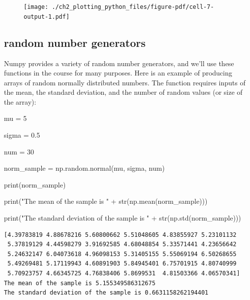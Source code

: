 \documentclass[
  letterpaper,
  DIV=11,
  numbers=noendperiod]{scrreprt}
\newenvironment{Shaded}{\begin{snugshade}}{\end{snugshade}}
\newcommand{\BuiltInTok}[1]{\textcolor[rgb]{0.00,0.23,0.31}{#1}}
\newcommand{\DecValTok}[1]{\textcolor[rgb]{0.68,0.00,0.00}{#1}}
\newcommand{\FloatTok}[1]{\textcolor[rgb]{0.68,0.00,0.00}{#1}}
\newcommand{\NormalTok}[1]{\textcolor[rgb]{0.00,0.23,0.31}{#1}}
\newcommand{\OperatorTok}[1]{\textcolor[rgb]{0.37,0.37,0.37}{#1}}
\newcommand{\StringTok}[1]{\textcolor[rgb]{0.13,0.47,0.30}{#1}}
\begin{document}
\begin{figure}[H]

{\centering \texttt{[image: ./ch2\_plotting\_python\_files/figure-pdf/cell-7-output-1.pdf]}

}

\end{figure}

\hypertarget{random-number-generators}{%
\subsection{random number generators}\label{random-number-generators}}

Numpy provides a variety of random number generators, and we'll use
these functions in the course for many purposes. Here is an example of
producing arrays of random normally distributed numbers. The function
requires inputs of the mean, the standard deviation, and the number of
random values (or size of the array):

\begin{Shaded}
\begin{Highlighting}[]
\NormalTok{mu }\OperatorTok{=} \DecValTok{5}

\NormalTok{sigma }\OperatorTok{=} \FloatTok{0.5}

\NormalTok{num }\OperatorTok{=} \DecValTok{30}

\NormalTok{norm\_sample }\OperatorTok{=}\NormalTok{ np.random.normal(mu, sigma, num)}

\BuiltInTok{print}\NormalTok{(norm\_sample)}

\BuiltInTok{print}\NormalTok{(}\StringTok{"The mean of the sample is "} \OperatorTok{+} \BuiltInTok{str}\NormalTok{(np.mean(norm\_sample)))}

\BuiltInTok{print}\NormalTok{(}\StringTok{"The standard deviation of the sample is "} \OperatorTok{+} \BuiltInTok{str}\NormalTok{(np.std(norm\_sample)))}
\end{Highlighting}
\end{Shaded}

\begin{verbatim}
[4.39783819 4.88678216 5.60800662 5.51048605 4.83855927 5.23101132
 5.37819129 4.44598279 3.91692585 4.68048854 5.33571441 4.23656642
 5.24632147 6.04073618 4.96098153 5.31405155 5.55069194 6.50268655
 5.49269481 5.17119943 4.60891903 5.84945401 6.75701915 4.80740999
 5.70923757 4.66345725 4.76838406 5.8699531  4.81503366 4.06570341]
The mean of the sample is 5.155349586312675
The standard deviation of the sample is 0.6631158262194401
\end{verbatim}
\end{document}
